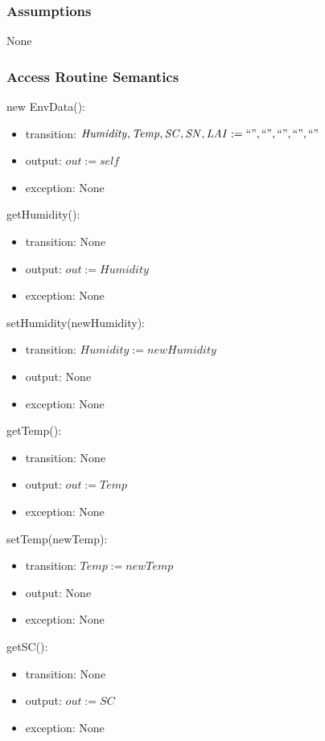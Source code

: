 \documentclass[12pt, titlepage]{article}
\begin{document}
\subsubsection{Assumptions}
None

\subsubsection{Access Routine Semantics}

\noindent new EnvData():
\begin{itemize}
\item transition: $\mathit{Humidity, Temp, SC, SN, LAI := ``", ``", ``", ``", ``"}$
\item output: $\mathit{out := self}$
\item exception: None 
\end{itemize}

\newcommand{\attr}{Humidity}
\noindent get\attr():
\begin{itemize}
\item transition: None
\item output: $\mathit{out := \attr}$
\item exception: None
\end{itemize}

\noindent set\attr(new\attr):
\begin{itemize}
\item transition: $\mathit{\attr := new\attr}$
\item output: None
\item exception: None
\end{itemize}

\renewcommand{\attr}{Temp}
\noindent get\attr():
\begin{itemize}
\item transition: None
\item output: $\mathit{out := \attr}$
\item exception: None
\end{itemize}

\noindent set\attr(new\attr):
\begin{itemize}
\item transition: $\mathit{\attr := new\attr}$
\item output: None
\item exception: None
\end{itemize}

\renewcommand{\attr}{SC}
\noindent get\attr():
\begin{itemize}
\item transition: None
\item output: $\mathit{out := \attr}$
\item exception: None
\end{itemize}
\end{document}

